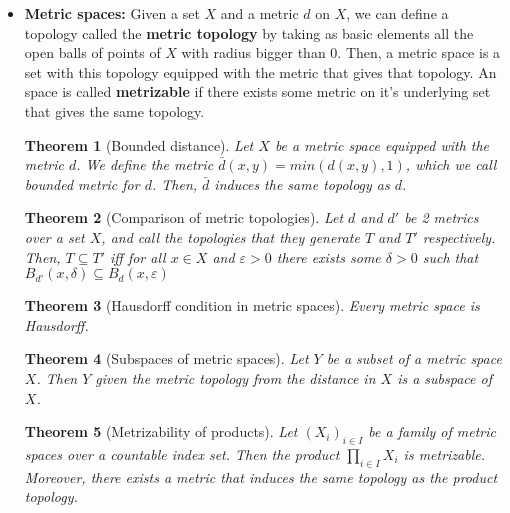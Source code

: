 \documentclass[a4paper]{article}
\newtheorem{theorem}{Theorem}[section]
\begin{document}
\begin{itemize}
\item
\textbf{Metric spaces: }Given a set $X$ and a metric $d$ on $X$, we can define a topology called the \textbf{metric topology} by taking as basic elements all the open balls of points of $X$ with radius bigger than 0. Then, a metric space is a set with this topology equipped with the metric that gives that topology. An space is called \textbf{metrizable} if there exists some metric on it's underlying set that gives the same topology.

\begin{theorem}[Bounded distance]
Let $X$ be a metric space equipped with the metric $d$. We define the metric $\bar{d}(x,y) = min (d(x,y), 1)$, which we call bounded metric for $d$. Then, $\bar{d}$ induces the same topology as $d$.
\end{theorem}

\begin{theorem}[Comparison of metric topologies]
Let $d$ and $d'$ be 2 metrics over a set $X$, and call the topologies that they generate $T$ and $T'$ respectively. Then, $T\subseteq T'$ iff for all $x\in X$ and $\varepsilon > 0$ there exists some $\delta > 0$ such that $B_{d'}(x,\delta)\subseteq B_{d}(x, \varepsilon)$
\end{theorem}

\begin{theorem}[Hausdorff condition in metric spaces]
Every metric space is Hausdorff.
\end{theorem}

\begin{theorem}[Subspaces of metric spaces]
Let $Y$ be a subset of a metric space $X$. Then $Y$ given the metric topology from the distance in $X$ is a subspace of $X$.
\end{theorem}

\begin{theorem}[Metrizability of products]
Let $(X_{i})_{i\in I}$ be a family of metric spaces over a countable index set. Then the product ${\displaystyle \prod_{i\in I}X_{i} }$ is metrizable. Moreover, there exists a metric that induces the same topology as the product topology.
\end{theorem}


\end{itemize}
\end{document}
